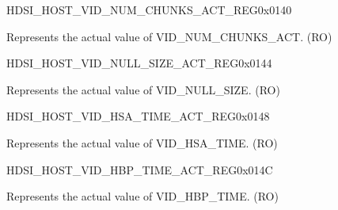 \begin{register}{H}{DSI\_HOST\_VID\_NUM\_CHUNKS\_ACT\_REG}{0x0140}\label{regdesc:DSIHOSTVIDNUMCHUNKSACTREG}
%
%
\regnewline%
\begin{regdesc}\begin{reglist}
\label{fielddesc:DSIHOSTVIDNUMCHUNKSACT}\item [DSI\_HOST\_VID\_NUM\_CHUNKS\_ACT] Represents the actual value of VID\_NUM\_CHUNKS\_ACT. (RO)
\end{reglist}\end{regdesc}
\end{register}


\begin{register}{H}{DSI\_HOST\_VID\_NULL\_SIZE\_ACT\_REG}{0x0144}\label{regdesc:DSIHOSTVIDNULLSIZEACTREG}
%
%
\regnewline%
\begin{regdesc}\begin{reglist}
\label{fielddesc:DSIHOSTVIDNULLSIZEACT}\item [DSI\_HOST\_VID\_NULL\_SIZE\_ACT] Represents the actual value of VID\_NULL\_SIZE. (RO)
\end{reglist}\end{regdesc}
\end{register}


\begin{register}{H}{DSI\_HOST\_VID\_HSA\_TIME\_ACT\_REG}{0x0148}\label{regdesc:DSIHOSTVIDHSATIMEACTREG}
%
%
\regnewline%
\begin{regdesc}\begin{reglist}
\label{fielddesc:DSIHOSTVIDHSATIMEACT}\item [DSI\_HOST\_VID\_HSA\_TIME\_ACT] Represents the actual value of VID\_HSA\_TIME. (RO)
\end{reglist}\end{regdesc}
\end{register}


\begin{register}{H}{DSI\_HOST\_VID\_HBP\_TIME\_ACT\_REG}{0x014C}\label{regdesc:DSIHOSTVIDHBPTIMEACTREG}
%
%
\regnewline%
\begin{regdesc}\begin{reglist}
\label{fielddesc:DSIHOSTVIDHBPTIMEACT}\item [DSI\_HOST\_VID\_HBP\_TIME\_ACT] Represents the actual value of VID\_HBP\_TIME. (RO)
\end{reglist}\end{regdesc}
\end{register}


